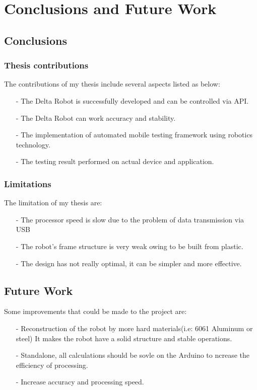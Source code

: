 \chapter{Conclusions and Future Work}

\section{Conclusions}
	\subsection{Thesis contributions}
	The contributions of my thesis include several aspects listed as below:
	\begin{itemize}
		\item[-] The Delta Robot is successfully developed and can be controlled via API.
		\item[-] The Delta Robot can work accuracy and stability.
		\item[-] The implementation of automated mobile testing framework using robotics technology.
		\item[-] The testing result performed on actual device and application.
	\end{itemize}
	\subsection{Limitations}
	The limitation of my thesis are:
	\begin{itemize}
		\item[-] The processor speed is slow due to the problem of data transmission via USB
		\item[-] The robot's frame structure is very weak owing to be built from plastic.
		\item[-] The design has not really optimal, it can be simpler and more effective.
	\end{itemize}

\section{Future Work}
	
	Some improvements that could be made to the project are:
	\begin{itemize}
		\item[-] Reconstruction of the robot by more hard materials(i.e: 6061 Aluminum or steel) It makes the robot have a solid structure and stable operations.
		\item[-] Standalone, all calculations should be sovle on the Arduino to ncrease the efficiency of processing.
		\item[-] Increase accuracy and processing speed.
	\end{itemize}
